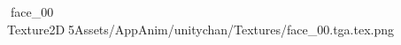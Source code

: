    face_00             	   Texture2D   5   Assets/AppAnim/unitychan/Textures/face_00.tga.tex.png